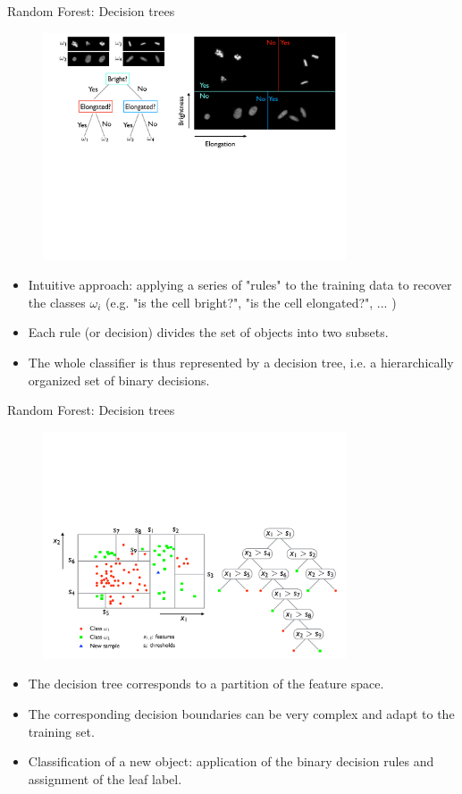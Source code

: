 \documentclass[xcolor=pdftex,dvipsnames,table]{beamer}
\begin{document}
\begin{frame}{Random Forest: Decision trees}
\begin{figure}[htb]
\includegraphics[width=0.8\textwidth]{../graphics/CellClassification_RF.pdf}
\end{figure}

\begin{itemize}
	\item Intuitive approach: applying a series of "rules" to the training data to recover the classes $\omega_i$ (e.g. "is the cell bright?", "is the cell elongated?", ... )
	\item Each rule (or decision) divides the set of objects into two subsets.
	\item The whole classifier is thus represented by a decision tree, i.e. a hierarchically organized set of binary decisions.
\end{itemize}
\end{frame}

\begin{frame}{Random Forest: Decision trees}
\begin{figure}[htb]
\includegraphics[width=0.8\textwidth]{../graphics/RF2.pdf}
\end{figure}
\begin{itemize}
	\item The decision tree corresponds to a partition of the feature space.
	\item The corresponding decision boundaries can be very complex and adapt to the training set.
	\item Classification of a new object: application of the binary decision rules and assignment of the leaf label.
\end{itemize}
\end{frame}
\end{document}
